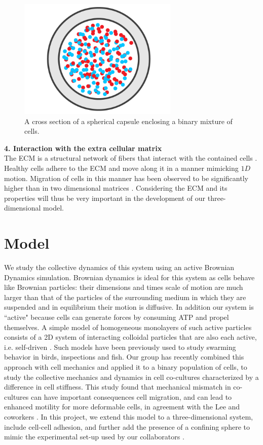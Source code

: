 \documentclass[aps,prb,twocolumn,groupedaddress,nofootinbib,floatfix]{revtex4}
\begin{document}
\begin{figure}
  \includegraphics[width=3in]{Fig1.png}
  \caption[capsule]
   {A cross section of a spherical capsule enclosing a binary mixture of 
   cells.}
   \label{fig:capsule}
\end{figure}

{\bf 4. Interaction with the extra cellular matrix}\\
The ECM is a structural network of fibers that interact with the contained 
cells \cite{Alberts}. Healthy cells adhere to the ECM and move along it in
a manner mimicking $1D$ motion. Migration of cells in this manner has been 
observed to be significantly higher than in two dimensional matrices
\cite{Doyle}. Considering the ECM and its properties will thus be very 
important in the development of our three-dimensional model. 


\section*{Model}

We study the collective dynamics of this system using an active Brownian Dynamics simulation. Brownian dynamics is ideal for this system as cells behave like Brownian particles: 
their dimensions and times scale of motion are much larger than that of the particles of the surrounding medium in which they are suspended and in equilibrium  their motion is diffusive. In addition
our system is ``active" because cells can generate forces by consuming ATP and propel themselves. A simple model of homogeneous monolayers of such active particles consists
of a 2D system of interacting colloidal particles that are also each active, i.e. self-driven \cite{FilyMarchetti,RednerBaskaran}. 
Such models have been previously used to study swarming  behavior \cite{Vicsek} in birds, inspections and fish. Our group has recently combined this approach with cell 
mechanics and applied it to a binary population of cells, to study the collective mechanics and dynamics in cell co-cultures characterized by a difference in cell stiffness.
This study found that mechanical mismatch in co-cultures can have important consequences cell migration, and can lead to enhanced motility for more deformable cells\cite{Butcher}, 
in agreement with the Lee and coworkers \cite{Lee}. In this project, we extend this model to a three-dimensional system, include cell-cell adhesion, and further add the presence of a 
confining sphere to mimic the experimental set-up used by our collaborators \cite{mingming}. 
\end{document}
